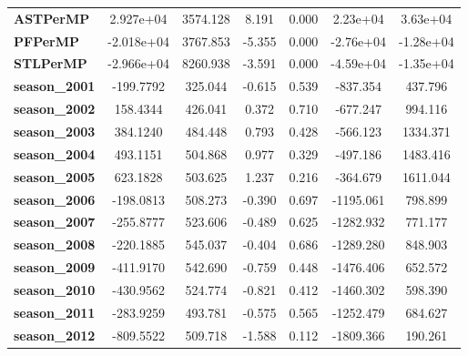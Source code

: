 \begin{center}
\begin{tabular}{lcccccc}
\textbf{ASTPerMP}             &    2.927e+04  &     3574.128     &     8.191  &         0.000        &     2.23e+04    &     3.63e+04     \\
\textbf{PFPerMP}              &   -2.018e+04  &     3767.853     &    -5.355  &         0.000        &    -2.76e+04    &    -1.28e+04     \\
\textbf{STLPerMP}             &   -2.966e+04  &     8260.938     &    -3.591  &         0.000        &    -4.59e+04    &    -1.35e+04     \\
\textbf{season\_2001}         &    -199.7792  &      325.044     &    -0.615  &         0.539        &     -837.354    &      437.796     \\
\textbf{season\_2002}         &     158.4344  &      426.041     &     0.372  &         0.710        &     -677.247    &      994.116     \\
\textbf{season\_2003}         &     384.1240  &      484.448     &     0.793  &         0.428        &     -566.123    &     1334.371     \\
\textbf{season\_2004}         &     493.1151  &      504.868     &     0.977  &         0.329        &     -497.186    &     1483.416     \\
\textbf{season\_2005}         &     623.1828  &      503.625     &     1.237  &         0.216        &     -364.679    &     1611.044     \\
\textbf{season\_2006}         &    -198.0813  &      508.273     &    -0.390  &         0.697        &    -1195.061    &      798.899     \\
\textbf{season\_2007}         &    -255.8777  &      523.606     &    -0.489  &         0.625        &    -1282.932    &      771.177     \\
\textbf{season\_2008}         &    -220.1885  &      545.037     &    -0.404  &         0.686        &    -1289.280    &      848.903     \\
\textbf{season\_2009}         &    -411.9170  &      542.690     &    -0.759  &         0.448        &    -1476.406    &      652.572     \\
\textbf{season\_2010}         &    -430.9562  &      524.774     &    -0.821  &         0.412        &    -1460.302    &      598.390     \\
\textbf{season\_2011}         &    -283.9259  &      493.781     &    -0.575  &         0.565        &    -1252.479    &      684.627     \\
\textbf{season\_2012}         &    -809.5522  &      509.718     &    -1.588  &         0.112        &    -1809.366    &      190.261     \\

\end{tabular}
\end{center}

